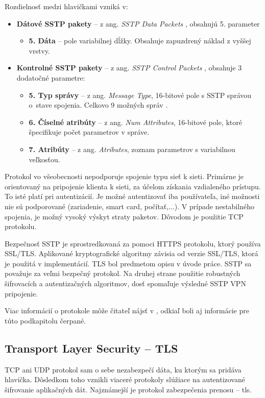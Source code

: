 Rozdielnosť medzi hlavičkami vzniká v:
\begin{itemize}
	\item{\textbf{Dátové SSTP pakety}} -- z ang. \textit{SSTP Data Packets} \cite{datpak}, obsahujú 5. parameter 
		\begin{itemize}
			\item{\textbf{5. Dáta}} -- pole variabilnej dĺžky. Obsahuje zapuzdrený náklad z vyššej vrstvy.
		\end{itemize} 
	\item{\textbf{Kontrolné SSTP pakety}} -- z ang. \textit{SSTP Control Packets} \cite{conpak}, obsahuje 3 dodatočné parametre:
		\begin{itemize}
			\item{\textbf{5. Typ správy}} -- z ang. \textit{Message Type}, 16-bitové pole s SSTP správou o~stave spojenia. Celkovo 9 možných správ \cite{conpak}. 
			\item{\textbf{6. Číselné atribúty}} -- z ang. \textit{Num Attributes}, 16-bitové pole, ktoré špecifikuje počet parametrov v správe.
			\item{\textbf{7. Atribúty}} -- z ang. \textit{Atributes}, zoznam parametrov s variabilnou veľkosťou.
		\end{itemize}	
\end{itemize}   
 
Protokol vo všeobecnosti nepodporuje spojenie typu sieť k sieti. Primárne je orientovaný na pripojenie klienta k sieti, za účelom získania vzdialeného prístupu. To isté platí pri autentizácií. Je možné autentizovať iba používateľa, iné možnosti nie sú podporované (zariadenie, smart card, počítať,...). V prípade nestabilného spojenia, je možný vysoký výskyt straty paketov. Dôvodom je použitie TCP protokolu. 

Bezpečnosť SSTP je sprostredkovaná za pomoci HTTPS protokolu, ktorý používa SSL/TLS. Aplikované kryptografické algoritmy závisia od verzie SSL/TLS, ktorá je použitá v implementácií. TLS bol predmetom opisu v úvode práce. SSTP sa považuje za veľmi bezpečný protokol. Na druhej strane použitie robustných šifrovacích a autentizačných algoritmov, dosť spomaľuje výsledné SSTP VPN pripojenie.

Viac informácií o protokole môže čitateľ nájsť v \cite{mssstp}, odkiaľ boli aj informácie pre túto podkapitolu čerpané.  

\subsection{Transport Layer Security -- TLS}
TCP ani UDP protokol sam o sebe nezabezpečí dáta, ku ktorým sa pridáva hlavička. Dôsledkom toho vznikli viaceré protokoly slúžiace na autentizované šifrovanie aplikačných dát. Najznámejší je protokol zabezpečenia prenosu -- \acrshort{tls}. 

